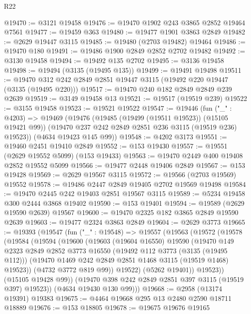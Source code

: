 \begin{lexlean}{R22}
\begin{coremodule}
@19470 := @3121 @19458
@19476 := @19470 @1902 @243 @3865 @2852 @19464 @7561
@19477 := @19459 @363
@19480 := @19477 @1901 @3863 @2849
@19482 := @2629 @19447 @3115
@19485 := @19480 (@2703 @19482) @19464
@19486 := @19470 @180
@19491 := @19486 @1900 @2849 @2852 @2702 @19482
@19492 := @3130 @19458
@19494 := @19492 @135 @2702
@19495 := @3136 @19458
@19498 := @19494 (@3135 (@19495 @135))
@19499 := @19491 @19498
@19511 := @19470 @312 @242 @2849 @2851 @19447 @3115 (@19492 @220 @19447 (@3135 (@19495 @220)))
@19517 := @19470 @240 @182 @2849 @2849 @239 @2639
@19519 := @3149 @19458 @13
@19521 := @19517 (@19519 @239)
@19522 := @3155 @19458
@19523 := @19521 @19522
@19547 := @19446
    (fun ("_" : @4203) =>
    @19469
      (@19476
        (@19485 (@19499 (@19511 @19523)) (@15105 @19421 @99))
        (@19470 @237 @242 @2849 @2851 @236 @3115 (@19519 @236) @19523))
      (@4634 @19423 @145 @99))
@19548 := @4202 @3173
@19551 := @19460 @2451 @19410 @2849
@19552 := @153 @19430
@19557 := @19551 (@2629 @19552 @5099) (@153 @19433)
@19563 := @19470 @2449 @400 @19408 @2852 @19552 @5099
@19566 := @19477 @2448 @19406 @2849
@19567 := @153 @19428
@19569 := @2629 @19567 @3115
@19572 := @19566 (@2703 @19569) @19552
@19578 := @19486 @2447 @2849 @19405 @2702 @19569 @19498
@19584 := @19470 @2445 @242 @19403 @2851 @19567 @3115
@19589 := @5234 @19458 @300 @2444 @3868 @19402
@19590 := @153 @19401
@19594 := @19589 (@2629 @19590 @2639) @19567
@19600 := @19470 @2325 @182 @3865 @2849 @19590 @2639
@19603 := @19477 @2324 @3863 @2849
@19604 := @2629 @3773
@19665 := @19393
    (@19547
      (fun ("_" : @19548) =>
      @19557
        (@19563
          (@19572
            (@19578
              (@19584
                (@19594
                  (@19600
                    (@19603
                      (@19604 @16550)
                      @19590
                      (@19470
                        @149
                        @2323
                        @2849
                        @2852
                        @3773
                        @16550
                        (@19492 @112 @3773 (@3135 (@19495 @112)))
                        (@19470 @1469 @242 @2849 @2851 @1468 @3115 (@19519 @1468) @19523))
                      (@4732 @3772 @819 @99))
                    @19522)
                  (@5262 @19401))
                @19523))
            (@15105 @19428 @99))
          (@19470 @398 @242 @2849 @2851 @397 @3115 (@19519 @397) @19523))
        (@4634 @19430 @130 @99)))
@19668 := @2958 (@13174 @19391) @19383
@19675 := @4464 @19668 @295 @13 @2480 @2590 @18711 @18889
@19676 := @153 @18805
@19678 := @19675 @19676 @19165

\end{coremodule}
\end{lexlean}

